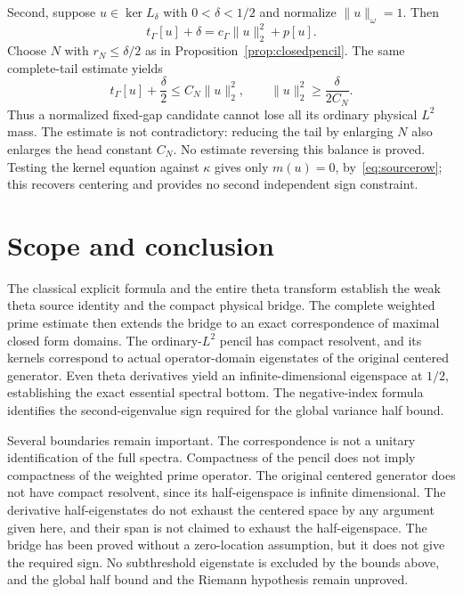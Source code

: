 \documentclass[11pt,a4paper]{article}
\numberwithin{equation}{section}
\theoremstyle{remark}
\newcommand{\tg}{t_{\Gamma}}
\newcommand{\cg}{c_{\Gamma}}
\newcommand{\norm}[1]{\lVert #1\rVert}
\begin{document}
Second, suppose $u\in\ker L_\delta$ with $0<\delta<1/2$ and normalize $\norm{u}_\omega=1$. Then
\begin{equation}\label{eq:stateidentity}
 \tg[u]+\delta=\cg\norm{u}_2^2+p[u].
\end{equation}
Choose $N$ with $r_N\le\delta/2$ as in Proposition~\ref{prop:closedpencil}. The same complete-tail estimate yields
\begin{equation}\label{eq:statebound}
 \tg[u]+\frac\delta2\le C_N\norm{u}_2^2,
 \qquad \norm{u}_2^2\ge\frac{\delta}{2C_N}.
\end{equation}
Thus a normalized fixed-gap candidate cannot lose all its ordinary physical $L^2$ mass. The estimate is not contradictory: reducing the tail by enlarging $N$ also enlarges the head constant $C_N$. No estimate reversing this balance is proved. Testing the kernel equation against $\kappa$ gives only $m(u)=0$, by~\eqref{eq:sourcerow}; this recovers centering and provides no second independent sign constraint.

\section{Scope and conclusion}

The classical explicit formula and the entire theta transform establish the weak theta source identity and the compact physical bridge. The complete weighted prime estimate then extends the bridge to an exact correspondence of maximal closed form domains. The ordinary-$L^2$ pencil has compact resolvent, and its kernels correspond to actual operator-domain eigenstates of the original centered generator. Even theta derivatives yield an infinite-dimensional eigenspace at $1/2$, establishing the exact essential spectral bottom. The negative-index formula identifies the second-eigenvalue sign required for the global variance half bound.

Several boundaries remain important. The correspondence is not a unitary identification of the full spectra. Compactness of the pencil does not imply compactness of the weighted prime operator. The original centered generator does not have compact resolvent, since its half-eigenspace is infinite dimensional. The derivative half-eigenstates do not exhaust the centered space by any argument given here, and their span is not claimed to exhaust the half-eigenspace. The bridge has been proved without a zero-location assumption, but it does not give the required sign. No subthreshold eigenstate is excluded by the bounds above, and the global half bound and the Riemann hypothesis remain unproved.
\end{document}
